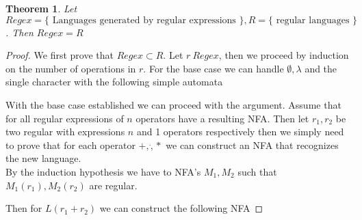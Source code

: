 \documentclass[11pt]{exam}
\newtheorem{theorem}{Theorem}[section]
\begin{document}
\begin{theorem}
Let $Regex = \{ \text{ Languages generated by regular expressions } \}, R = \{ \text{ regular languages } \}$. Then $Regex = R$
\end{theorem}
\begin{proof}
We first prove that $Regex \subset R$. Let $r \ Regex$, then we proceed by induction on the number of operations in $r$. For the base case we can handle $\emptyset, \lambda$ and the single character with the following simple automata

\begin{center}


\end{center}

With the base case established we can proceed with the argument. Assume that for all regular expressions of $n$ operators have a resulting NFA. Then let $r_1,r_2$ be two regular with  expressions $n$ and 1 operators respectively then we simply need to prove that for each operator $+,\dot,*$ we can construct an NFA that recognizes the new language.\\

By the induction hypothesis we have to NFA's $M_1,M_2$ such that $M_1(r_1),M_2(r_2)$ are regular.

Then for $L(r_1 + r_2)$ we can construct the following NFA



\end{proof}
\end{document}

